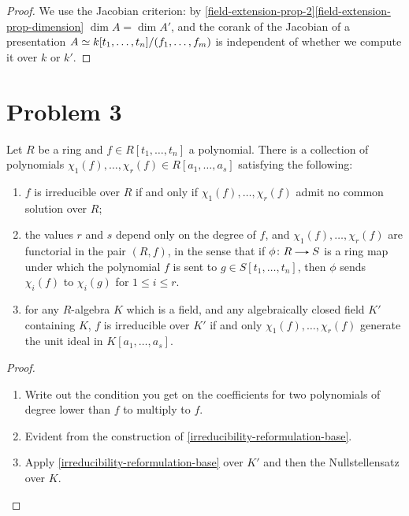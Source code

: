 \begin{proof}
  We use the Jacobian criterion: by \cref{field-extension-prop-2}\cref{field-extension-prop-dimension} $\dim A = \dim A'$, and the corank of the Jacobian of a presentation $A \simeq k[t_1,\ldots,t_n]/(f_1,\ldots,f_m)$ is independent of whether we compute it over $k$ or $k'$.
\end{proof}


\section{Problem 3}

\begin{proposition}
  \label{irreducibility-reformulation}
  Let $R$ be a ring and $f \in R[t_1,\ldots,t_n]$ a polynomial. There is a collection of polynomials $\chi_1(f),\ldots,\chi_r(f) \in R[a_1,\ldots,a_s]$ satisfying the following:
  \begin{enumerate}
  \item \label{irreducibility-reformulation-base} $f$ is irreducible over $R$ if and only if $\chi_1(f),\ldots,\chi_r(f)$ admit no common solution over $R$;
  \item \label{irreducibility-reformulation-functor} the values $r$ and $s$ depend only on the degree of $f$, and $\chi_1(f),\ldots,\chi_r(f)$ are functorial in the pair $(R,f)$, in the sense that if $\phi \c R \to S$ is a ring map under which the polynomial $f$ is sent to $g \in S[t_1,\ldots,t_n]$, then $\phi$ sends $\chi_i(f)$ to $\chi_i(g)$ for $1 \le i \le r$.
  \item \label{irreducibility-reformulation-geometric} for any $R$-algebra $K$ which is a field, and any algebraically closed field $K'$ containing $K$, $f$ is irreducible over $K'$ if and only $\chi_1(f),\ldots,\chi_r(f)$ generate the unit ideal in $K[a_1,\ldots,a_s]$.
  \end{enumerate}
\end{proposition}

\begin{proof}
  \begin{enumerate}[leftmargin=*]
  \item Write out the condition you get on the coefficients for two polynomials of degree lower than $f$ to multiply to $f$.
  \item Evident from the construction of \cref{irreducibility-reformulation-base}.
  \item Apply \cref{irreducibility-reformulation-base} over $K'$ and then the Nullstellensatz over $K$. \qedhere
  \end{enumerate}
\end{proof}

